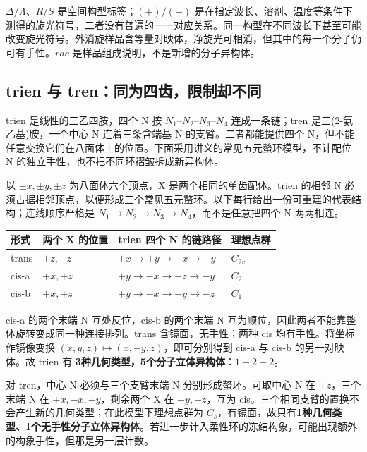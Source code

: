 \begin{keyidea}[构型符号不是旋光方向]
$\Delta/\Lambda$、$R/S$ 是空间构型标签；$(+)/(−)$ 是在指定波长、溶剂、温度等条件下测得的旋光符号，二者没有普遍的一一对应关系。同一构型在不同波长下甚至可能改变旋光符号。外消旋样品含等量对映体，净旋光可相消，但其中的每一个分子仍可有手性。$rac$ 是样品组成说明，不是新增的分子异构体。
\end{keyidea}

\subsection{trien 与 tren：同为四齿，限制却不同}
trien 是线性的三乙四胺，四个 N 按 $N_1$--$N_2$--$N_3$--$N_4$ 连成一条链；tren 是三(2-氨乙基)胺，一个中心 N 连着三条含端基 N 的支臂。二者都能提供四个 N，但不能任意交换它们在八面体上的位置。下面采用讲义的常见五元螯环模型，不计配位 N 的独立手性，也不把不同环褶皱拆成新异构体。

\begin{worked}
以 $\pm x,\pm y,\pm z$ 为八面体六个顶点，X 是两个相同的单齿配体。trien 的相邻 N 必须占据相邻顶点，以便形成三个常见五元螯环。以下每行给出一份可重建的代表结构；连线顺序严格是 $N_1\to N_2\to N_3\to N_4$，而不是任意把四个 N 两两相连。

\begin{center}
\footnotesize
\begin{tabular}{@{}llll@{}}
\toprule
形式 & 两个 X 的位置 & trien 四个 N 的链路径 & 理想点群 \\
\midrule
trans & $+z,-z$ & $+x\to+y\to-x\to-y$ & $C_{2v}$ \\
cis-a & $+x,+z$ & $+y\to-x\to-z\to-y$ & $C_2$ \\
cis-b & $+x,+z$ & $+y\to-x\to-y\to-z$ & $C_1$ \\
\bottomrule
\end{tabular}
\end{center}

cis-a 的两个末端 N 互处反位，cis-b 的两个末端 N 互为顺位，因此两者不能靠整体旋转变成同一种连接排列。trans 含镜面，无手性；两种 cis 均有手性。将坐标作镜像变换 $(x,y,z)\mapsto(x,-y,z)$，即可分别得到 cis-a 与 cis-b 的另一对映体。故 trien 有 \textbf{3种几何类型，5个分子立体异构体}：$1+2+2$。

对 tren，中心 N 必须与三个支臂末端 N 分别形成螯环。可取中心 N 在 $+z$，三个末端 N 在 $+x,-x,+y$，剩余两个 X 在 $-y,-z$，互为 cis。三个相同支臂的置换不会产生新的几何类型；在此模型下理想点群为 $C_s$，有镜面，故只有\textbf{1种几何类型、1个无手性分子立体异构体}。若进一步计入柔性环的冻结构象，可能出现额外的构象手性，但那是另一层计数。

\end{worked}

